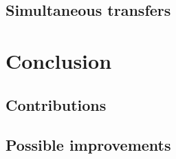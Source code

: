 \documentclass[journal]{IEEEtran}
\begin{document}
\subsection{Simultaneous transfers}






\section{Conclusion}

\subsection{Contributions}


\subsection{Possible improvements}







 

%


\end{document}
